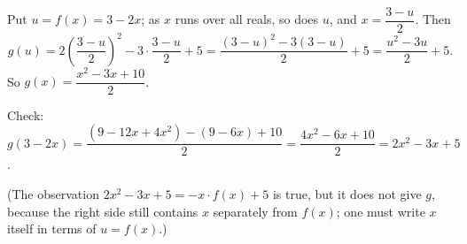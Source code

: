 Put $u=f(x)=3-2x$; as $x$ runs over all reals, so does $u$, and $x=\dfrac{3-u}{2}$. Then
\[
g(u)=2\left(\dfrac{3-u}{2}\right)^2-3\cdot\dfrac{3-u}{2}+5=\dfrac{(3-u)^2-3(3-u)}{2}+5=\dfrac{u^2-3u}{2}+5 .
\]
So $\boxed{g(x)=\dfrac{x^2-3x+10}{2}}$.

Check: $g(3-2x)=\dfrac{(9-12x+4x^2)-(9-6x)+10}{2}=\dfrac{4x^2-6x+10}{2}=2x^2-3x+5$.

(The observation $2x^2-3x+5=-x\cdot f(x)+5$ is true, but it does not give $g$, because the right side still contains $x$ separately from $f(x)$; one must write $x$ itself in terms of $u=f(x)$.)

